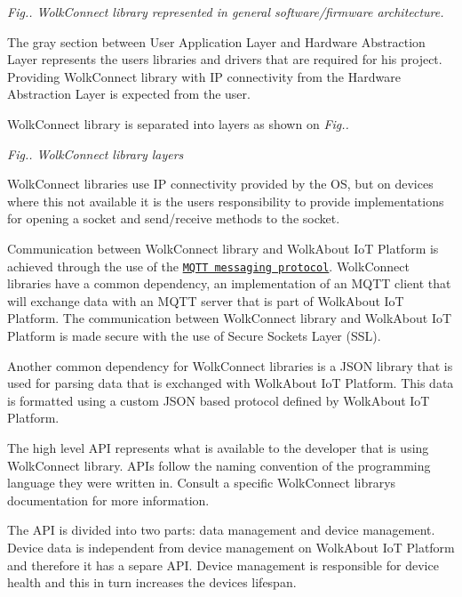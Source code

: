  \begin{center} {\itshape Fig.. Wolk\+Connect library represented in general software/firmware architecture.} \end{center} 

The gray section between User Application Layer and Hardware Abstraction Layer represents the user\textquotesingle{}s libraries and drivers that are required for his project. Providing Wolk\+Connect library with IP connectivity from the Hardware Abstraction Layer is expected from the user.

Wolk\+Connect library is separated into layers as shown on {\itshape Fig..}

 \begin{center} {\itshape Fig.. Wolk\+Connect library layer\textquotesingle{}s} \end{center} 

Wolk\+Connect libraries use IP connectivity provided by the OS, but on devices where this not available it is the user\textquotesingle{}s responsibility to provide implementations for opening a socket and send/receive methods to the socket.

Communication between Wolk\+Connect library and Wolk\+About IoT Platform is achieved through the use of the \href{http://mqtt.org/}{\tt M\+Q\+TT messaging protocol}. Wolk\+Connect libraries have a common dependency, an implementation of an M\+Q\+TT client that will exchange data with an M\+Q\+TT server that is part of Wolk\+About IoT Platform. The communication between Wolk\+Connect library and Wolk\+About IoT Platform is made secure with the use of Secure Sockets Layer (S\+SL).

Another common dependency for Wolk\+Connect libraries is a J\+S\+ON library that is used for parsing data that is exchanged with Wolk\+About IoT Platform. This data is formatted using a custom J\+S\+ON based protocol defined by Wolk\+About IoT Platform.

The high level A\+PI represents what is available to the developer that is using Wolk\+Connect library. A\+P\+Is follow the naming convention of the programming language they were written in. Consult a specific Wolk\+Connect library\textquotesingle{}s documentation for more information.

The A\+PI is divided into two parts\+: data management and device management. Device data is independent from device management on Wolk\+About IoT Platform and therefore it has a separe A\+PI. Device management is responsible for device health and this in turn increases the device\textquotesingle{}s lifespan.

